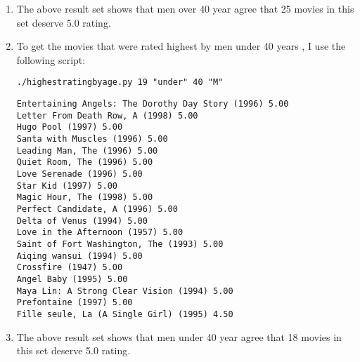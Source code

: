 \begin{enumerate}
\begin{lstlisting}[frame=single]
\end{lstlisting}
\item The above result set shows that men over 40 year agree that 25 movies in this set deserve 5.0 rating.
\item To get the movies that were rated highest by men under 40 years , I use the following script:
\begin{lstlisting}[frame=single]
 ./highestratingbyage.py 19 "under" 40 "M"
\end{lstlisting}
\begin{lstlisting}[frame=single]
Entertaining Angels: The Dorothy Day Story (1996) 5.00
Letter From Death Row, A (1998) 5.00
Hugo Pool (1997) 5.00
Santa with Muscles (1996) 5.00
Leading Man, The (1996) 5.00
Quiet Room, The (1996) 5.00
Love Serenade (1996) 5.00
Star Kid (1997) 5.00
Magic Hour, The (1998) 5.00
Perfect Candidate, A (1996) 5.00
Delta of Venus (1994) 5.00
Love in the Afternoon (1957) 5.00
Saint of Fort Washington, The (1993) 5.00
Aiqing wansui (1994) 5.00
Crossfire (1947) 5.00
Angel Baby (1995) 5.00
Maya Lin: A Strong Clear Vision (1994) 5.00
Prefontaine (1997) 5.00
Fille seule, La (A Single Girl) (1995) 4.50
\end{lstlisting}
\item The above result set shows that men under 40 year agree that 18 movies in this set deserve 5.0 rating.
\end{enumerate} 

\newpage

\newpage
